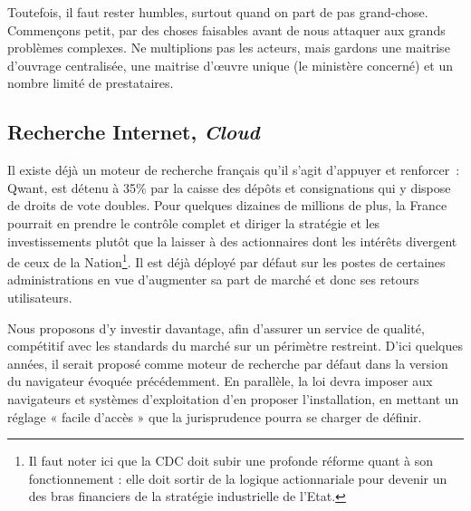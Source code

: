 \documentclass[a4paper]{article}
\begin{document}
Toutefois, il faut rester humbles, surtout quand on part de pas grand-chose. Commençons petit, par des choses faisables avant de nous attaquer aux grands problèmes complexes. Ne multiplions pas les acteurs, mais gardons une maitrise d’ouvrage centralisée, une maitrise d’œuvre unique (le ministère concerné) et un nombre limité de prestataires. 

\subsection{Recherche Internet, \textit{Cloud}}
Il existe déjà un moteur de recherche français qu’il s’agit d’appuyer et renforcer~: Qwant, est détenu à 35\% par la caisse des dépôts et consignations qui y dispose de droits de vote doubles. Pour quelques dizaines de millions de plus, la France pourrait en prendre le contrôle complet et diriger la stratégie et les investissements plutôt que la laisser à des actionnaires dont les intérêts divergent de ceux de la Nation\footnote{Il faut noter ici que la CDC doit subir une profonde réforme quant à son fonctionnement : elle doit sortir de la logique actionnariale pour devenir un des bras financiers de la stratégie industrielle de l’Etat.}. Il est déjà déployé par défaut sur les postes de certaines administrations en vue d’augmenter sa part de marché et donc ses retours utilisateurs.

Nous proposons d’y investir davantage, afin d’assurer un service de qualité, compétitif avec les standards du marché sur un périmètre restreint. D’ici quelques années, il serait proposé comme moteur de recherche par défaut dans la version du navigateur évoquée précédemment. En parallèle, la loi devra imposer aux navigateurs et systèmes d’exploitation d’en proposer l’installation, en mettant un réglage « facile d’accès » que la jurisprudence pourra se charger de définir. 
\end{document}
